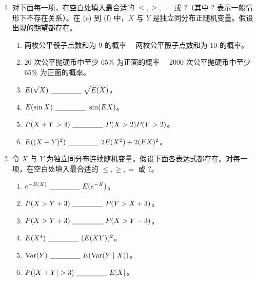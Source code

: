 \documentclass[UTF8, 12pt, fontset=fandol, oneside]{ctexart}
\begin{document}
\begin{enumerate}
  \item 对下面每一项，在空白处填入最合适的 $\le,\ge,=$ 或 $?$（其中 $?$ 表示一般情形下不存在关系）。在 (c) 到 (f) 中，$X$ 与 $Y$ 是独立同分布正随机变量。假设出现的期望都存在。
  \begin{enumerate}
    \item 两枚公平骰子点数和为 $9$ 的概率 \ \underline{\hspace{1.5cm}}\ 两枚公平骰子点数和为 $10$ 的概率。
    \item $20$ 次公平抛硬币中至少 $65\%$ 为正面的概率 \ \underline{\hspace{1.5cm}}\ $2000$ 次公平抛硬币中至少 $65\%$ 为正面的概率。
    \item $E(\sqrt X)\ \underline{\hspace{1.5cm}}\ \sqrt{E(X)}$。
    \item $E(\sin X)\ \underline{\hspace{1.5cm}}\ \sin(EX)$。
    \item $P(X+Y>4)\ \underline{\hspace{1.5cm}}\ P(X>2)P(Y>2)$。
    \item $E((X+Y)^2)\ \underline{\hspace{1.5cm}}\ 2E(X^2)+2(EX)^2$。
  \end{enumerate}

  \item 令 $X$ 与 $Y$ 为独立同分布连续随机变量。假设下面各表达式都存在。对每一项，在空白处填入最合适的 $\le,\ge,=$ 或 $?$。
  \begin{enumerate}
    \item $e^{-E(X)}\ \underline{\hspace{1.5cm}}\ E(e^{-X})$。
    \item $P(X>Y+3)\ \underline{\hspace{1.5cm}}\ P(Y>X+3)$。
    \item $P(X>Y+3)\ \underline{\hspace{1.5cm}}\ P(X>Y-3)$。
    \item $E(X^4)\ \underline{\hspace{1.5cm}}\ (E(XY))^2$。
    \item $\operatorname{Var}(Y)\ \underline{\hspace{1.5cm}}\ E(\operatorname{Var}(Y\mid X))$。
    \item $P(|X+Y|>3)\ \underline{\hspace{1.5cm}}\ E|X|$。
  \end{enumerate}


\end{enumerate}
\end{document}
